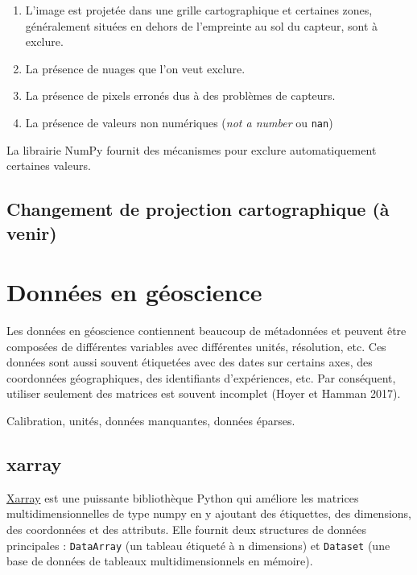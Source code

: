 \documentclass[
  11pt,
  letterpaper,
  open=any,
  twoside=false,
  french]{scrbook}
\begin{document}
\begin{enumerate}
\def\labelenumi{\arabic{enumi}.}
\item
  L'image est projetée dans une grille cartographique et certaines
  zones, généralement situées en dehors de l'empreinte au sol du
  capteur, sont à exclure.
\item
  La présence de nuages que l'on veut exclure.
\item
  La présence de pixels erronés dus à des problèmes de capteurs.
\item
  La présence de valeurs non numériques (\emph{not a number} ou
  \texttt{nan})
\end{enumerate}

La librairie NumPy fournit des mécanismes pour exclure automatiquement
certaines valeurs.

\subsection{Changement de projection cartographique (à
venir)}\label{changement-de-projection-cartographique-uxe0-venir}

\section{Données en géoscience}\label{donnuxe9es-en-guxe9oscience}

Les données en géoscience contiennent beaucoup de métadonnées et peuvent
être composées de différentes variables avec différentes unités,
résolution, etc. Ces données sont aussi souvent étiquetées avec des
dates sur certains axes, des coordonnées géographiques, des identifiants
d'expériences, etc. Par conséquent, utiliser seulement des matrices est
souvent incomplet (Hoyer et Hamman 2017).

Calibration, unités, données manquantes, données éparses.

\subsection{xarray}\label{xarray}

\href{https://docs.xarray.dev/en/latest/getting-started-guide/why-xarray.html}{Xarray}
est une puissante bibliothèque Python qui améliore les matrices
multidimensionnelles de type numpy en y ajoutant des étiquettes, des
dimensions, des coordonnées et des attributs. Elle fournit deux
structures de données principales : \texttt{DataArray} (un tableau
étiqueté à n dimensions) et \texttt{Dataset} (une base de données de
tableaux multidimensionnels en mémoire).
\end{document}
